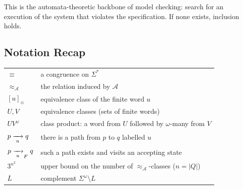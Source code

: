 This is the automata-theoretic backbone of model checking: search for an
execution of the system that violates the specification.  If none
exists, inclusion holds.


\subsection*{Notation Recap}

\begin{tabular}{@{}l@{\quad}l@{}}
  $\equiv$ & a congruence on $\Sigma^*$ \\
  $\approx_{\mathcal A}$ & the relation induced by $\mathcal A$ \\
  $[u]_\equiv$ & equivalence class of the finite word $u$ \\
  $U, V$ & equivalence classes (sets of finite words) \\
  $UV^\omega$ & class product: a word from $U$ followed by $\omega$-many from $V$ \\
  $p \xrightarrow[{\;u\;}]{} q$ & there is a path from $p$ to $q$ labelled $u$ \\
  $p \xrightarrow[{\;u\;}]{}_{F} q$ & such a path exists and visits an accepting state \\
  $3^{n^2}$ & upper bound on the number of $\approx_{\mathcal A}$-classes ($n=|Q|$) \\
  $\overline{L}$ & complement $\Sigma^\omega\setminus L$ \\
\end{tabular}

\bigskip

